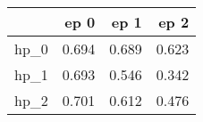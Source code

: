 \begin{tabular}{lrrr}
\toprule
{} &   ep 0 &   ep 1 &   ep 2 \\
\midrule
hp\_0 &  0.694 &  0.689 &  0.623 \\
hp\_1 &  0.693 &  0.546 &  0.342 \\
hp\_2 &  0.701 &  0.612 &  0.476 \\
\bottomrule
\end{tabular}
